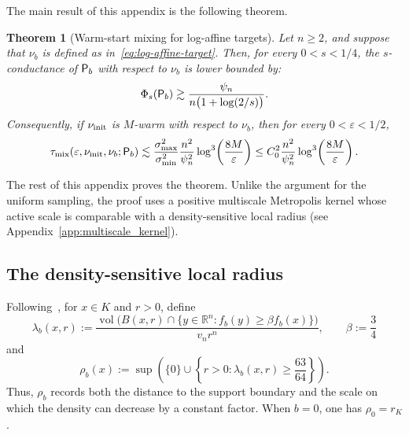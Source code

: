 \documentclass[11pt]{article}
\newtheorem{theorem}{Theorem}[section]
\theoremstyle{definition}
\theoremstyle{remark}
\newcommand{\R}{\mathbb R}
\newcommand{\vol}{\operatorname{vol}}
\newcommand{\mix}{\mathrm{mix}}
\newcommand{\rK}{r_K}
\begin{document}
The main result of this appendix is the following theorem.
\begin{theorem}[Warm-start mixing for log-affine targets]
\label{thm:log-affine-main}
Let $n\ge2$, and suppose that $\nu_b$ is defined as in~\eqref{eq:log-affine-target}.  Then, for every $0<s<1/4$, the $s$-conductance of ${\sf P}_b$ with respect to $\nu_b$ is lower bounded by:
\begin{equation}\label{eq:log-affine-conductance}
 \Phi_s({\sf P}_b)
 \gtrsim
 \frac{\psi_n}{n\bigl(1+\log(2/s)\bigr)}.
\end{equation}
Consequently, if $\nu_{\rm init}$ is $M$-warm with respect to $\nu_b$, then
for every $0<\varepsilon<1/2$,
\begin{equation}\label{eq:log-affine-mixing-simple}
 \tau_{\mix}(\varepsilon,\nu_{\rm init},\nu_b;{\sf P}_b)
 \lesssim \frac{\sigma_{\max}^2}{\sigma_{\min}^2}
 \frac{n^2}{\psi_n^2}
 \log^3\!\left(\frac{8M}{\varepsilon}\right)\leq C_0^2 \frac{n^2}{\psi_n^2}
 \log^3\!\left(\frac{8M}{\varepsilon}\right).
\end{equation}
\end{theorem}

The rest of this appendix proves the theorem.  Unlike the argument for the uniform sampling, the proof uses a positive multiscale Metropolis kernel whose active scale is comparable with a density-sensitive local radius (see Appendix~\ref{app:multiscale_kernel}). 

\subsection{The density-sensitive local radius}

Following~\cite[Section~6.2]{LV}, for $x\in K$ and $r>0$, define
\begin{equation}\label{eq:log-affine-local-occupancy}
 \lambda_b(x,r)
 := 
 \frac{\vol\bigl(
 B(x,r)\cap \{y\in\R^n:f_b(y)\ge\beta f_b(x)\}
 \bigr)}{v_n r^n},\qquad \beta :=\frac{3}{4}
\end{equation}
and
\begin{equation}\label{eq:log-affine-local-radius}
 \rho_b(x)
 :=
 \sup\left(
 \{0\}\cup\left\{r>0:\lambda_b(x,r)\ge\frac{63}{64}\right\}
 \right).
\end{equation}
Thus, $\rho_b$ records both the distance to the support boundary and the scale on which the density can decrease by a constant factor.  When $b=0$, one has $\rho_0=\rK$.
\end{document}
